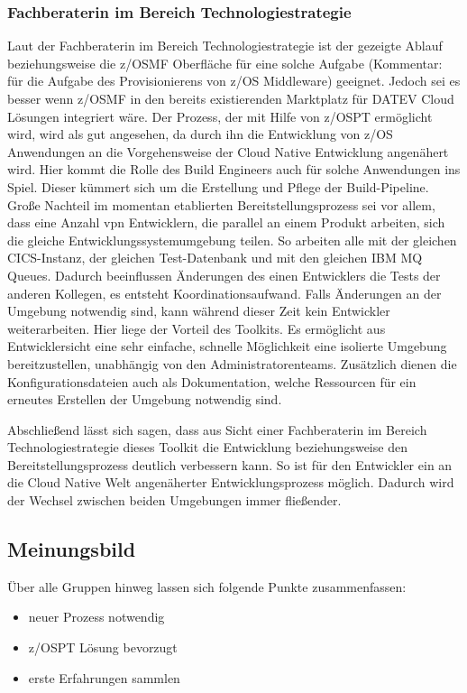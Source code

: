 \subsubsection{Fachberaterin im Bereich Technologiestrategie}
Laut der Fachberaterin im Bereich Technologiestrategie ist der gezeigte Ablauf beziehungsweise die z/OSMF Oberfläche für eine solche Aufgabe (Kommentar: für die Aufgabe des Provisionierens von z/OS Middleware) geeignet.
Jedoch sei es besser wenn z/OSMF in den bereits existierenden \glqq Marktplatz\grqq{} für DATEV Cloud Lösungen integriert wäre.
Der Prozess, der mit Hilfe von z/OSPT ermöglicht wird, wird als gut angesehen, da durch ihn die Entwicklung von z/OS Anwendungen an die Vorgehensweise der Cloud Native Entwicklung angenähert wird.
Hier kommt die Rolle des Build Engineers auch für solche Anwendungen ins Spiel.
Dieser kümmert sich um die Erstellung und Pflege der Build-Pipeline.
Große Nachteil im momentan etablierten Bereitstellungsprozess sei vor allem,  dass eine Anzahl vpn Entwicklern, die parallel an einem Produkt arbeiten, sich die gleiche Entwicklungssystemumgebung teilen.
So arbeiten alle mit der gleichen CICS-Instanz, der gleichen Test-Datenbank und mit den gleichen IBM MQ Queues.
Dadurch beeinflussen Änderungen des einen Entwicklers die Tests der anderen Kollegen, es entsteht Koordinationsaufwand.
Falls Änderungen an der Umgebung notwendig sind, kann während dieser Zeit kein Entwickler weiterarbeiten.
Hier liege der Vorteil des Toolkits.
Es ermöglicht aus Entwicklersicht eine sehr einfache, schnelle Möglichkeit eine isolierte Umgebung bereitzustellen, unabhängig von den Administratorenteams.
Zusätzlich dienen die Konfigurationsdateien auch als Dokumentation, welche Ressourcen für ein erneutes Erstellen der Umgebung notwendig sind.

Abschließend lässt sich sagen, dass aus Sicht einer Fachberaterin im Bereich Technologiestrategie dieses Toolkit die Entwicklung beziehungsweise den Bereitstellungsprozess deutlich verbessern kann.
So ist für den Entwickler ein an die Cloud Native Welt angenäherter Entwicklungsprozess möglich.
Dadurch wird der Wechsel zwischen beiden Umgebungen immer fließender.

\subsection{Meinungsbild}
Über alle Gruppen hinweg lassen sich folgende Punkte zusammenfassen:

\begin{samepage}
\begin{itemize}
\item neuer Prozess notwendig
\item z/OSPT Lösung bevorzugt
\item erste Erfahrungen sammlen
\end{itemize}
\end{samepage}

